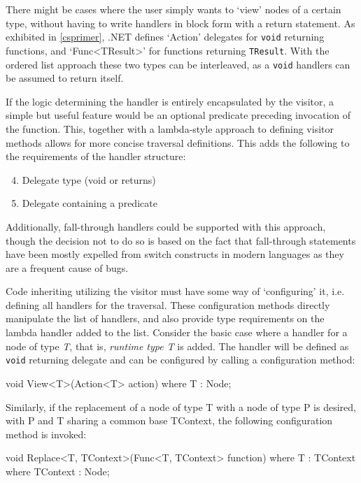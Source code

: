 \documentclass[twoside,openright]{uva-bachelor-thesis}
\newcommand{\code}[1]{\texttt{\footnotesize#1}}
\begin{document}
			There might be cases where the user simply wants to `view' nodes of a certain type, without having to write handlers in block form with a return statement. As exhibited in \cref{csprimer}, .NET defines `Action' delegates for \code{void} returning functions, and `Func<TResult>' for functions returning \code{TResult}. With the ordered list approach these two types can be interleaved, as a \code{void} handlers can be assumed to return itself.
			
			If the logic determining the handler is entirely encapsulated by the visitor, a simple but useful feature would be an optional predicate preceding invocation of the function. This, together with a lambda-style approach to defining visitor methods allows for more concise traversal definitions. This adds the following to the requirements of the handler structure:
			\begin{enumerate}
				\setcounter{enumi}{3}
				\item Delegate type (void or returns)
				\item Delegate containing a predicate
			\end{enumerate}
						
			Additionally, fall-through handlers could be supported with this approach, though the decision not to do so is based on the fact that fall-through statements have been mostly expelled from switch constructs in modern languages as they are a frequent cause of bugs.
			
			Code inheriting utilizing the visitor must have some way of `configuring' it, i.e. defining all handlers for the traversal. These configuration methods directly manipulate the list of handlers, and also provide type requirements on the lambda handler added to the list. Consider the basic case where a handler for a node of type \emph{T}, that is, \emph{runtime type T} is added. The handler will be defined as \code{void} returning delegate and can be configured by calling a configuration method:
			\begin{codespan}
				\begin{csharpcode}
					void View<T>(Action<T> action)
						where T : Node;
				\end{csharpcode}
			\end{codespan}
			
			Similarly, if the replacement of a node of type T with a node of type P is desired, with P and T sharing a common base TContext, the following configuration method is invoked:
			\begin{codespan}
				\begin{csharpcode}
					void Replace<T, TContext>(Func<T, TContext> function)
						where T : TContext
						where TContext : Node;
				\end{csharpcode}
			\end{codespan}
			
\end{document}
